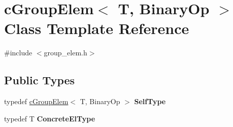 \hypertarget{classcGroupElem}{
\section{c\-Group\-Elem$<$ \-T, \-Binary\-Op $>$ \-Class \-Template \-Reference}
\label{classcGroupElem}
}


{\ttfamily \#include $<$group\-\_\-elem.\-h$>$}

\subsection*{\-Public \-Types}
\begin{DoxyCompactItemize}
\item 
\hypertarget{classcGroupElem_a59d8e25f570c976b3c7f13756ada8dc4}{
typedef \hyperlink{classcGroupElem}{c\-Group\-Elem}$<$ \-T, \-Binary\-Op $>$ {\bfseries \-Self\-Type}}
\label{classcGroupElem_a59d8e25f570c976b3c7f13756ada8dc4}

\item 
\hypertarget{classcGroupElem_a49af5748a3d451f2256fb82266338bca}{
typedef \-T {\bfseries \-Concrete\-El\-Type}}
\label{classcGroupElem_a49af5748a3d451f2256fb82266338bca}

\end{DoxyCompactItemize}
